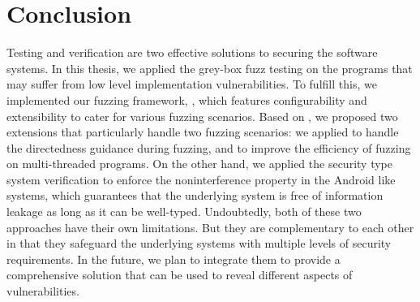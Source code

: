 
\chapter{Conclusion} \label{ch:conclusion}


Testing and verification are two effective solutions to securing the software systems. In this thesis, we applied the grey-box fuzz testing on the programs that may suffer from low level implementation vulnerabilities. To fulfill this, we implemented our fuzzing framework, \FOT, which features configurability and extensibility to cater for various fuzzing scenarios. Based on \FOT, we proposed two extensions that particularly handle two fuzzing scenarios: we applied \dFOT to handle the directedness guidance during fuzzing, and \mtfuzz to improve the efficiency of fuzzing on multi-threaded programs. On the other hand, we applied the security type system verification to enforce the noninterference property in the Android like systems, which guarantees that the underlying system is free of information leakage as long as it can be well-typed. Undoubtedly, both of these two approaches have their own limitations. But they are complementary to each other in that they safeguard the underlying systems with multiple levels of security requirements. In the future, we plan to integrate them to provide a comprehensive solution that can be used to reveal different aspects of vulnerabilities.
